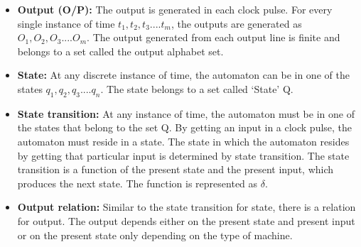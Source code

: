 \documentclass[8pt]{beamer}
\begin{document}
\begin{frame}

\begin{itemize}
  \item \textbf{Output (O/P):} The output is generated in each clock pulse. For every single instance of time $t_{1}, t_{2},
t_{3} .... t_{m}$, the outputs are generated as $O_{1}, O_{2}, O_{3} .... O_{m}$. The output generated from each output
line is finite and belongs to a set called the output alphabet set.\\
  \item \textbf{State:} At any discrete instance of time, the automaton can be in one of the states $q_{1}, q_{2}, q_{3} .... q_{n}$.
The state belongs to a set called ‘State’ Q.\\
  \item \textbf{State transition:} At any instance of time, the automaton must be in one of the states that belong
to the set Q. By getting an input in a clock pulse, the automaton must reside in a state. The state in
which the automaton resides by getting that particular input is determined by state transition. The
state transition is a function of the present state and the present input, which produces the next state.
The function is represented as $\delta$.\\
  \item \textbf{Output relation:} Similar to the state transition for state, there is a relation for output. The output
depends either on the present state and present input or on the present state only depending on the
type of machine.\\
\end{itemize}

\vspace*{0.4cm}
\end{frame}
\end{document}
